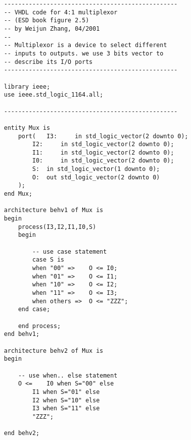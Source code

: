 \documentclass[12pt]{article}
\begin{document}
\pagecolor{bgcolor}\color{fgcolor} 

\begin{lstlisting} 
-------------------------------------------------
-- VHDL code for 4:1 multiplexor
-- (ESD book figure 2.5)
-- by Weijun Zhang, 04/2001
--
-- Multiplexor is a device to select different
-- inputs to outputs. we use 3 bits vector to 
-- describe its I/O ports 
-------------------------------------------------

library ieee;
use ieee.std_logic_1164.all;

-------------------------------------------------

entity Mux is
    port(	I3: 	in std_logic_vector(2 downto 0);
    	I2: 	in std_logic_vector(2 downto 0);
    	I1: 	in std_logic_vector(2 downto 0);
    	I0: 	in std_logic_vector(2 downto 0);
    	S:	in std_logic_vector(1 downto 0);
    	O:	out std_logic_vector(2 downto 0)
    );
end Mux;  

architecture behv1 of Mux is
begin
    process(I3,I2,I1,I0,S)
    begin
    
        -- use case statement
        case S is
	    when "00" =>	O <= I0;
	    when "01" =>	O <= I1;
	    when "10" =>	O <= I2;
	    when "11" =>	O <= I3;
	    when others =>	O <= "ZZZ";
	end case;

    end process;
end behv1;

architecture behv2 of Mux is
begin

    -- use when.. else statement
    O <=	I0 when S="00" else
		I1 when S="01" else
		I2 when S="10" else
		I3 when S="11" else
		"ZZZ";

end behv2;

\end{lstlisting} 
\end{document}
